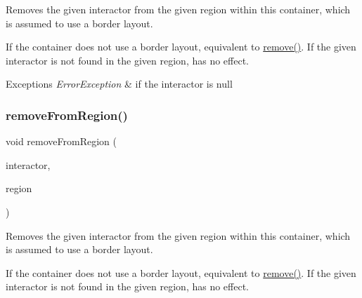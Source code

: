 Removes the given interactor from the given region within this container, which is assumed to use a border layout. 

If the container does not use a border layout, equivalent to \mbox{\hyperlink{classsgl_1_1GContainer_a1c12b1fde5c2ef10d79d4ee51e670efa}{remove()}}. If the given interactor is not found in the given region, has no effect. 
\begin{DoxyExceptions}{Exceptions}
{\em Error\+Exception} & if the interactor is null \\
\hline
\end{DoxyExceptions}
\mbox{\label{classsgl_1_1GContainer_afee7b65f917c4f6a0fdb1c8ea75406a5}} 
\subsubsection{\texorpdfstring{remove\+From\+Region()}{removeFromRegion()}\hspace{0.1cm}{\footnotesize\ttfamily [3/6]}}
{\footnotesize\ttfamily void remove\+From\+Region (\begin{DoxyParamCaption}\item[{\mbox{\hyperlink{classsgl_1_1GInteractor}{G\+Interactor}} \&}]{interactor,  }\item[{\mbox{\hyperlink{classsgl_1_1GContainer_a81a01a86de31071a92e6cce0bab9bc4b}{Region}}}]{region }\end{DoxyParamCaption})\hspace{0.3cm}{\ttfamily [virtual]}}



Removes the given interactor from the given region within this container, which is assumed to use a border layout. 

If the container does not use a border layout, equivalent to \mbox{\hyperlink{classsgl_1_1GContainer_a1c12b1fde5c2ef10d79d4ee51e670efa}{remove()}}. If the given interactor is not found in the given region, has no effect. \mbox{\label{classsgl_1_1GContainer_af7a055c83c0e0e3f3722596d7111fcbe}} 
